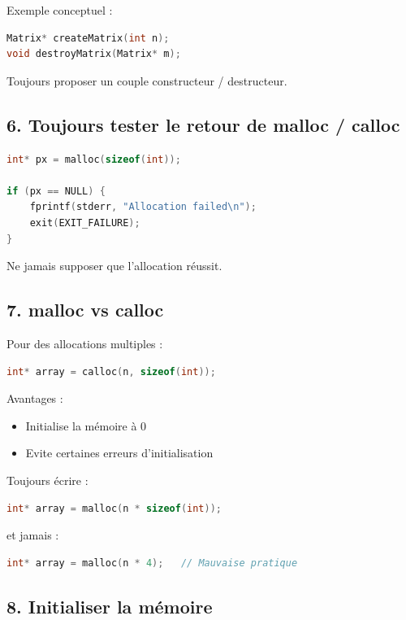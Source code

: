 Exemple conceptuel :

\begin{lstlisting}[language=C]
Matrix* createMatrix(int n);
void destroyMatrix(Matrix* m);
\end{lstlisting}

Toujours proposer un couple constructeur / destructeur.

\subsection{6. Toujours tester le retour de malloc / calloc}

\begin{lstlisting}[language=C]
int* px = malloc(sizeof(int));

if (px == NULL) {
    fprintf(stderr, "Allocation failed\n");
    exit(EXIT_FAILURE);
}
\end{lstlisting}

Ne jamais supposer que l’allocation réussit.

\subsection{7. malloc vs calloc}

Pour des allocations multiples :

\begin{lstlisting}[language=C]
int* array = calloc(n, sizeof(int));
\end{lstlisting}

Avantages :

\begin{itemize}
    \item Initialise la mémoire à 0
    \item Evite certaines erreurs d’initialisation
\end{itemize}

Toujours écrire :

\begin{lstlisting}[language=C]
int* array = malloc(n * sizeof(int));
\end{lstlisting}

et jamais :

\begin{lstlisting}[language=C]
int* array = malloc(n * 4);   // Mauvaise pratique
\end{lstlisting}

\subsection{8. Initialiser la mémoire}

